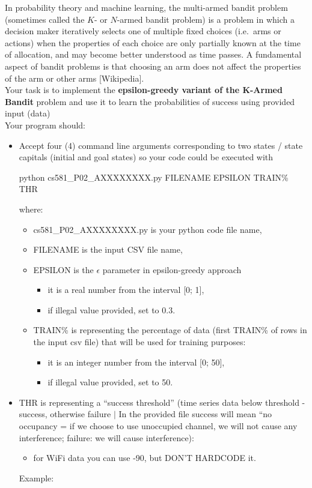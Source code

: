 \documentclass[
	type={Programming},
	assignment={2},
	points={100},
	duedate={Sunday, April 7, 2024, 11:59 CST},
	template=true,
]{cs581homework}
\begin{document}
\begin{problemdescription}
	In probability theory and machine learning, the multi-armed bandit problem (sometimes called the $K$- or $N$-armed bandit problem) is a problem in which a decision maker iteratively selects one of multiple fixed choices (i.e.\ arms or actions) when the properties of each choice are only partially known at the time of allocation, and may become better understood as time passes.
	A fundamental aspect of bandit problems is that choosing an arm does not affect the properties of the arm or other arms [Wikipedia].\\

	Your task is to implement the \textbf{epsilon-greedy variant of the $\mathbf{K}$-Armed Bandit} problem and use it to learn the probabilities of success using provided input (data)\\

	Your program should:
	\begin{itemize}
		\item Accept four (4) command line arguments corresponding to two states / state capitals (initial and goal states) so your code could be executed with
		\begin{center}
			python cs581\_P02\_AXXXXXXXX.py FILENAME EPSILON TRAIN\% THR
		\end{center}
		where:
		\begin{itemize}
			\item cs581\_P02\_AXXXXXXXX.py is your python code file name,
			\item FILENAME is the input CSV file name,
			\item EPSILON is the $\epsilon$ parameter in epsilon-greedy approach
			\begin{itemize}
				\item it is a real number from the interval [0; 1],
				\item if illegal value provided, set to 0.3.
			\end{itemize}
			\item TRAIN\% is representing the percentage of data (first TRAIN\% of rows in the input csv file) that will be used for training purposes:
			\begin{itemize}
				\item it is an integer number from the interval [0; 50],
				\item if illegal value provided, set to 50.
			\end{itemize}
		\end{itemize}
		\item THR is representing a “success threshold” (time series data below threshold - success, otherwise failure $|$
		In the provided file success will mean “no occupancy = if we choose to use unoccupied channel, we will not cause any interference; failure: we will cause interference):
		\begin{itemize}
			\item for WiFi data you can use -90, but DON’T HARDCODE it.
		\end{itemize}
		Example:


\end{itemize}
\end{problemdescription}
\end{document}
